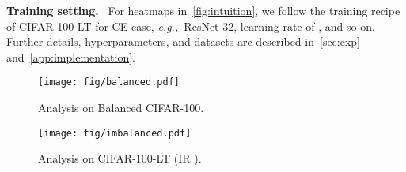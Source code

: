 \documentclass{article}
\newcommand{\eg}{\emph{e.g.,~}}
\newcommand{\myparagraph}[1]{\vspace{0.07cm}\noindent\textbf{#1}~}
\begin{document}
\myparagraph{Training setting.}
For heatmaps in~\autoref{fig:intuition}, we follow the training recipe of CIFAR-100-LT for CE case, \eg ResNet-32, learning rate of , and so on. Further details, hyperparameters, and datasets are described in~\autoref{sec:exp} and~\autoref{app:implementation}.

\begin{figure}[th]
  \centering
  \begin{minipage}{.49\textwidth}
    \centering
        \texttt{[image: fig/balanced.pdf]}
        \caption{Analysis on Balanced CIFAR-100.}
        \label{fig:balance_analysis}
    \end{minipage}
    \begin{minipage}{.49\textwidth}
    \centering
        \texttt{[image: fig/imbalanced.pdf]}
        \caption{Analysis on CIFAR-100-LT (IR ).}
        \label{fig:imbalance_analysis}
    \end{minipage}
\end{figure}
\end{document}
